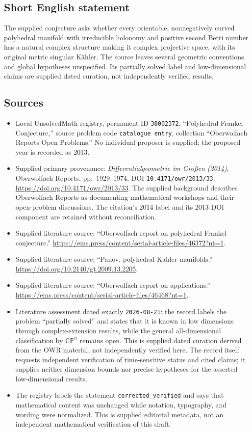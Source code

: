 \documentclass[11pt]{article}
\begin{document}
\subsection{Short English statement}
The supplied conjecture asks whether every orientable, nonnegatively curved polyhedral manifold with irreducible holonomy and positive second Betti number has a natural complex structure making it complex projective space, with its original metric singular K\"ahler. The source leaves several geometric conventions and global hypotheses unspecified. Its partially solved label and low-dimensional claims are supplied dated curation, not independently verified results.
\subsection{Sources}
\begin{itemize}
\item Local UnsolvedMath registry, permanent ID \texttt{30002372}, ``Polyhedral Frankel Conjecture,'' source problem code \texttt{catalogue entry}, collection ``Oberwolfach Reports Open Problems.'' No individual proposer is supplied; the proposed year is recorded as 2013.
\item Supplied primary provenance: \emph{Differentialgeometrie im Großen (2014)}, Oberwolfach Reports, pp.\ 1929--1974, DOI \texttt{10.4171/owr/2013/33}. \url{https://doi.org/10.4171/owr/2013/33}. The supplied background describes Oberwolfach Reports as documenting mathematical workshops and their open-problem discussions. The citation's 2014 label and its 2013 DOI component are retained without reconciliation.
\item Supplied literature source: ``Oberwolfach report on polyhedral Frankel conjecture.'' \url{https://ems.press/content/serial-article-files/46372?nt=1}.
\item Supplied literature source: ``Panov, polyhedral Kahler manifolds.'' \url{https://doi.org/10.2140/gt.2009.13.2205}.
\item Supplied literature source: ``Oberwolfach report on applications.'' \url{https://ems.press/content/serial-article-files/46468?nt=1}.
\item Literature assessment dated exactly \texttt{2026-08-21}: the record labels the problem ``partially solved'' and states that it is known in low dimensions through complex-extension results, while the general all-dimensional classification by \(\mathbb{CP}^{n}\) remains open. This is supplied dated curation derived from the OWR material, not independently verified here. The record itself requests independent verification of time-sensitive status and cited claims; it supplies neither dimension bounds nor precise hypotheses for the asserted low-dimensional results.
\item The registry labels the statement \texttt{corrected\_verified} and says that mathematical content was unchanged while notation, typography, and wording were normalized. This is supplied editorial metadata, not an independent mathematical verification of this draft.
\end{itemize}
\end{document}
